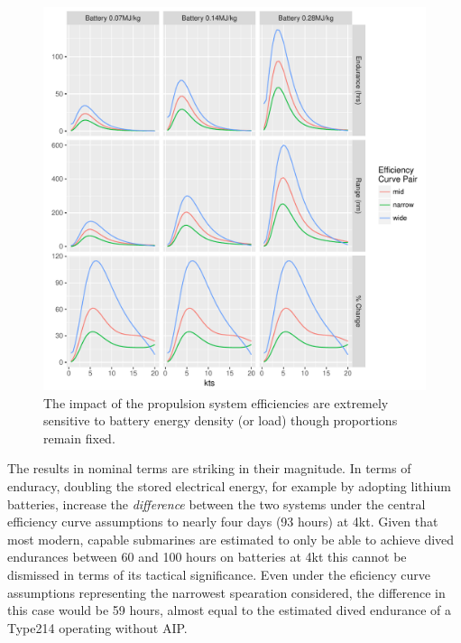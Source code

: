 \documentclass{article}\usepackage[]{graphicx}\usepackage[]{color}
\makeatletter
\def\maxwidth{ %
  \ifdim\Gin@nat@width>\linewidth
    \linewidth
  \else
    \Gin@nat@width
  \fi
}
\newenvironment{knitrout}{}{} %
\makeatother
\begin{document}
\begin{figure}
\begin{knitrout}
\color{fgcolor}

{\centering \includegraphics[width=\maxwidth]{figures/plots-plot_sens_battery-1} 

}



\end{knitrout}
\caption{The impact of the propulsion system efficiencies are extremely sensitive to battery energy density (or load) though proportions remain fixed.}
\label{fig:sens_battery}
\end{figure}

The results in nominal terms are striking in their magnitude.  In terms of enduracy, doubling the stored electrical energy, for example by adopting lithium batteries, increase the \textit{difference} between the two systems under the central efficiency curve assumptions to nearly four days (93 hours) at 4kt.  Given that most modern, capable submarines are estimated to only be able to achieve dived endurances between 60 and 100 hours on batteries at 4kt \parencite{buckingham2008submarine} this cannot be dismissed in terms of its tactical significance.  Even under the eficiency curve assumptions representing the narrowest spearation considered, the difference in this case would be 59 hours, almost equal to the estimated dived endurance of a Type214 operating without AIP.
\end{document}
